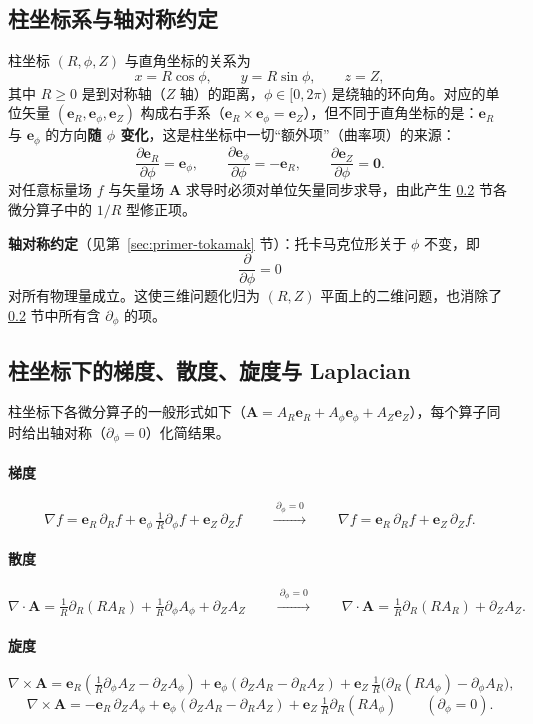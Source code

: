 \documentclass[12pt,fontset=none]{ctexart}
\numberwithin{equation}{section}
\numberwithin{table}{section}
\numberwithin{figure}{section}
\begin{document}
\subsection{柱坐标系与轴对称约定}\label{app:cyl}

柱坐标 $(R,\phi,Z)$ 与直角坐标的关系为
\[
  x=R\cos\phi,\qquad y=R\sin\phi,\qquad z=Z,
\]
其中 $R\ge 0$ 是到对称轴（$Z$ 轴）的距离，$\phi\in[0,2\pi)$ 是绕轴的环向角。对应的单位矢量 $(\bm{e}_R,\bm{e}_\phi,\bm{e}_Z)$ 构成右手系（$\bm{e}_R\times\bm{e}_\phi=\bm{e}_Z$），但不同于直角坐标的是：$\bm{e}_R$ 与 $\bm{e}_\phi$ 的方向\textbf{随 $\phi$ 变化}，这是柱坐标中一切``额外项''（曲率项）的来源：
\[
  \frac{\partial\bm{e}_R}{\partial\phi}=\bm{e}_\phi,\qquad
  \frac{\partial\bm{e}_\phi}{\partial\phi}=-\bm{e}_R,\qquad
  \frac{\partial\bm{e}_Z}{\partial\phi}=\bm{0}.
\]
对任意标量场 $f$ 与矢量场 $\bm{A}$ 求导时必须对单位矢量同步求导，由此产生 \ref{app:ops} 节各微分算子中的 $1/R$ 型修正项。

\textbf{轴对称约定}（见第~\ref{sec:primer-tokamak} 节）：托卡马克位形关于 $\phi$ 不变，即
\[
  \frac{\partial}{\partial\phi}=0
\]
对所有物理量成立。这使三维问题化归为 $(R,Z)$ 平面上的二维问题，也消除了 \ref{app:ops} 节中所有含 $\partial_\phi$ 的项。

\subsection{柱坐标下的梯度、散度、旋度与 Laplacian}\label{app:ops}

柱坐标下各微分算子的一般形式如下（$\bm{A}=A_R\bm{e}_R+A_\phi\bm{e}_\phi+A_Z\bm{e}_Z$），每个算子同时给出轴对称（$\partial_\phi=0$）化简结果。

\paragraph{梯度}
\[
  \nabla f=\bm{e}_R\,\partial_R f+\bm{e}_\phi\,\tfrac{1}{R}\partial_\phi f+\bm{e}_Z\,\partial_Z f
  \qquad\xrightarrow{\ \partial_\phi=0\ }\qquad
  \nabla f=\bm{e}_R\,\partial_R f+\bm{e}_Z\,\partial_Z f .
\]

\paragraph{散度}
\[
  \nabla\cdot\bm{A}=\tfrac{1}{R}\partial_R(RA_R)+\tfrac{1}{R}\partial_\phi A_\phi+\partial_ZA_Z
  \qquad\xrightarrow{\ \partial_\phi=0\ }\qquad
  \nabla\cdot\bm{A}=\tfrac{1}{R}\partial_R(RA_R)+\partial_ZA_Z .
\]

\paragraph{旋度}
\[
  \nabla\times\bm{A}=\bm{e}_R\!\left(\tfrac{1}{R}\partial_\phi A_Z-\partial_ZA_\phi\right)
  +\bm{e}_\phi\left(\partial_ZA_R-\partial_RA_Z\right)
  +\bm{e}_Z\,\tfrac{1}{R}\bigl(\partial_R(RA_\phi)-\partial_\phi A_R\bigr),
\]
\[
  \nabla\times\bm{A}=-\bm{e}_R\,\partial_ZA_\phi
  +\bm{e}_\phi\left(\partial_ZA_R-\partial_RA_Z\right)
  +\bm{e}_Z\,\tfrac{1}{R}\partial_R(RA_\phi)
  \qquad(\partial_\phi=0).
\]
\end{document}
